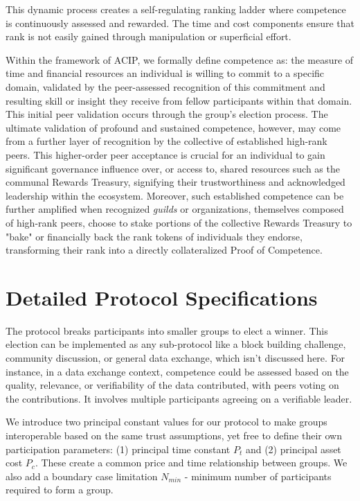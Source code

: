 \documentclass{article}
\begin{document}
\begin{CJK}{UTF8}{gbsn}
    This dynamic process creates a self-regulating ranking ladder where competence is continuously assessed and rewarded. The time and cost components ensure that rank is not easily gained through manipulation or superficial effort.

    Within the framework of ACIP, we formally define competence as: the measure of time and financial resources an individual is willing to commit to a specific domain, validated by the peer-assessed recognition of this commitment and resulting skill or insight they receive from fellow participants within that domain. This initial peer validation occurs through the group's election process. The ultimate validation of profound and sustained competence, however, may come from a further layer of recognition by the collective of established high-rank peers. This higher-order peer acceptance is crucial for an individual to gain significant governance influence over, or access to, shared resources such as the communal Rewards Treasury, signifying their trustworthiness and acknowledged leadership within the ecosystem. Moreover, such established competence can be further amplified when recognized \textit{guilds} or organizations, themselves composed of high-rank peers, choose to stake portions of the collective Rewards Treasury to "bake" or financially back the rank tokens of individuals they endorse, transforming their rank into a directly collateralized Proof of Competence.

    \section{Detailed Protocol Specifications}

    The protocol breaks participants into smaller groups to elect a winner. This election can be implemented as any sub-protocol like a block building challenge, community discussion, or general data exchange, which isn't discussed here. For instance, in a data exchange context, competence could be assessed based on the quality, relevance, or verifiability of the data contributed, with peers voting on the contributions. It involves multiple participants agreeing on a verifiable leader.

    We introduce two principal constant values for our protocol to make groups interoperable based on the same trust assumptions, yet free to define their own participation parameters: (1) principal time constant $P_t$ and (2) principal asset cost $P_c$. These create a common price and time relationship between groups. We also add a boundary case limitation $N_{min}$ - minimum number of participants required to form a group.


\end{CJK}
\end{document}
